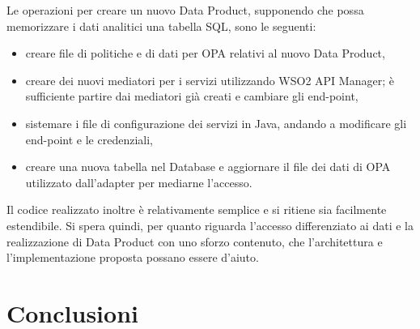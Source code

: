 \documentclass[12pt]{report}
\begin{document}
Le operazioni per creare un nuovo Data Product, supponendo che possa memorizzare i dati analitici una tabella SQL, sono le seguenti: 
\begin{itemize}
    \item creare file di politiche e di dati per OPA relativi al nuovo Data Product,
    \item creare dei nuovi mediatori per i servizi utilizzando WSO2 API Manager; è sufficiente partire dai mediatori già creati e cambiare gli end-point,
    \item sistemare i file di configurazione dei servizi in Java, andando a modificare gli end-point e le credenziali,
    \item creare una nuova tabella nel Database e aggiornare il file dei dati di OPA utilizzato dall'adapter per mediarne l'accesso.
\end{itemize} 
Il codice realizzato inoltre è relativamente semplice e si ritiene sia facilmente estendibile.
Si spera quindi, per quanto riguarda l'accesso differenziato ai dati e la realizzazione di Data Product con uno sforzo contenuto, che l'architettura e l'implementazione proposta possano essere d'aiuto.

\chapter*{Conclusioni}
 
 
\end{document}
